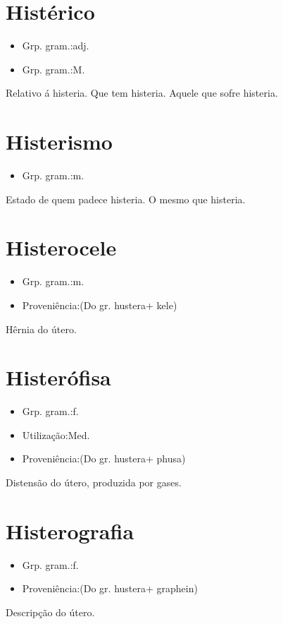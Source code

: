 \documentclass{article}
\begin{document}
\section{Histérico}
\begin{itemize}
\item {Grp. gram.:adj.}
\end{itemize}
\begin{itemize}
\item {Grp. gram.:M.}
\end{itemize}
Relativo á histeria.
Que tem histeria.
Aquele que sofre histeria.
\section{Histerismo}
\begin{itemize}
\item {Grp. gram.:m.}
\end{itemize}
Estado de quem padece histeria.
O mesmo que \textunderscore histeria\textunderscore .
\section{Histerocele}
\begin{itemize}
\item {Grp. gram.:m.}
\end{itemize}
\begin{itemize}
\item {Proveniência:(Do gr. \textunderscore hustera\textunderscore  + \textunderscore kele\textunderscore )}
\end{itemize}
Hêrnia do útero.
\section{Histerófisa}
\begin{itemize}
\item {Grp. gram.:f.}
\end{itemize}
\begin{itemize}
\item {Utilização:Med.}
\end{itemize}
\begin{itemize}
\item {Proveniência:(Do gr. \textunderscore hustera\textunderscore  + \textunderscore phusa\textunderscore )}
\end{itemize}
Distensão do útero, produzida por gases.
\section{Histerografia}
\begin{itemize}
\item {Grp. gram.:f.}
\end{itemize}
\begin{itemize}
\item {Proveniência:(Do gr. \textunderscore hustera\textunderscore  + \textunderscore graphein\textunderscore )}
\end{itemize}
Descripção do útero.
\end{document}
